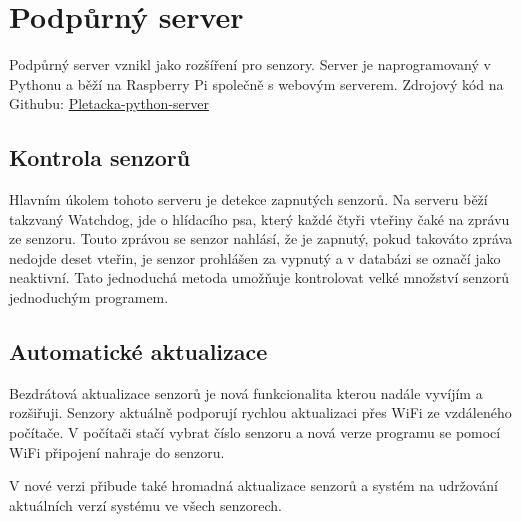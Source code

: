 \chapter{Podpůrný server}
Podpůrný server vznikl jako rozšíření pro senzory.
Server je naprogramovaný v Pythonu a běží na Raspberry Pi společně s webovým serverem.\newline
Zdrojový kód na Githubu: \href{https://github.com/Pletacka-IoT/Pletacka-python-server}{Pletacka-python-server}\cite{PL_PY}


\section{Kontrola senzorů}
Hlavním úkolem tohoto serveru je detekce zapnutých senzorů.
Na serveru běží takzvaný Watchdog, jde o hlídacího psa, který každé čtyři vteřiny čaké na zprávu ze senzoru.
Touto zprávou se senzor nahlásí, že je zapnutý, pokud takováto zpráva nedojde deset vteřin, je senzor prohlášen za vypnutý a v databázi se označí jako neaktivní.
Tato jednoduchá metoda umožňuje kontrolovat velké množství senzorů jednoduchým programem.

\section{Automatické aktualizace}
Bezdrátová aktualizace senzorů je nová funkcionalita kterou nadále vyvíjím a rozšiřuji.
Senzory aktuálně podporují rychlou aktualizaci přes WiFi ze vzdáleného počítače.
V počítači stačí vybrat číslo senzoru a nová verze programu se pomocí WiFi připojení nahraje do senzoru.

V nové verzi přibude také hromadná aktualizace senzorů a systém na udržování aktuálních verzí systému ve všech senzorech.




\newpage